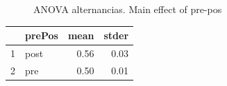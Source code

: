 \documentclass{article}
\begin{document}
\begin{figure}[H]
  \caption{ANOVA alternancias. Main effect of pre-pos}
  \noindent{}
  \centering
\end{figure}

\begin{table}[ht]
\centering
\begin{tabular}{rlrr}
  \hline
 & prePos & mean & stder \\ 
  \hline
  1 & post & 0.56 & 0.03 \\ 
  2 & pre & 0.50 & 0.01 \\ 
   \hline
\end{tabular}
\end{table}
\end{document}
